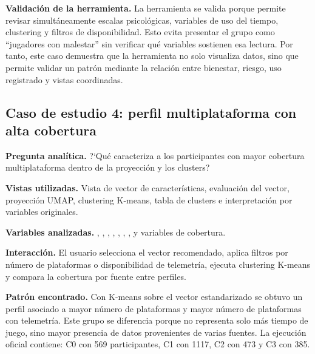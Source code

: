 \documentclass[12pt,a4paper]{article}
\begin{document}
\textbf{Validaci\'on de la herramienta.} La herramienta se valida porque permite revisar simult\'aneamente escalas psicol\'ogicas, variables de uso del tiempo, clustering y filtros de disponibilidad. Esto evita presentar el grupo como ``jugadores con malestar'' sin verificar qu\'e variables sostienen esa lectura. Por tanto, este caso demuestra que la herramienta no solo visualiza datos, sino que permite validar un patr\'on mediante la relaci\'on entre bienestar, riesgo, uso registrado y vistas coordinadas.

\subsection{Caso de estudio 4: perfil multiplataforma con alta cobertura}

\textbf{Pregunta anal\'itica.} ?`Qu\'e caracteriza a los participantes con mayor cobertura multiplataforma dentro de la proyecci\'on y los clusters?

\textbf{Vistas utilizadas.} Vista de vector de caracter\'isticas, evaluaci\'on del vector, proyecci\'on UMAP, clustering K-means, tabla de clusters e interpretaci\'on por variables originales.

\textbf{Variables analizadas.} , , , , , , ,  y variables de cobertura.

\textbf{Interacci\'on.} El usuario selecciona el vector recomendado, aplica filtros por n\'umero de plataformas o disponibilidad de telemetr\'ia, ejecuta clustering K-means y compara la cobertura por fuente entre perfiles.

\textbf{Patr\'on encontrado.} Con K-means sobre el vector estandarizado se obtuvo un perfil asociado a mayor n\'umero de plataformas y mayor n\'umero de plataformas con telemetr\'ia. Este grupo se diferencia porque no representa solo m\'as tiempo de juego, sino mayor presencia de datos provenientes de varias fuentes. La ejecuci\'on oficial contiene: C0 con 569 participantes, C1 con 1117, C2 con 473 y C3 con 385.
\end{document}
